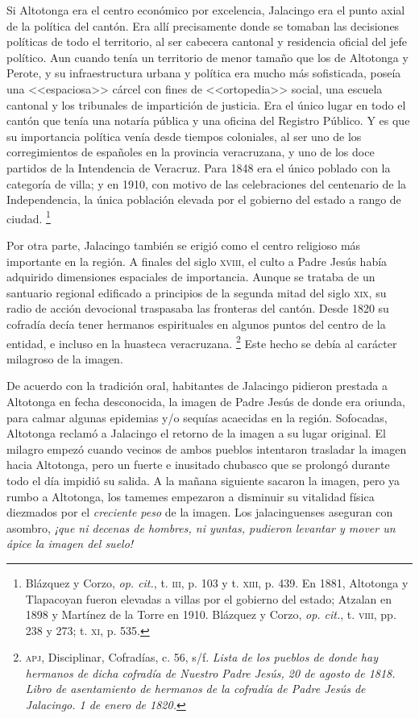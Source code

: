 \documentclass[14pt,twoside,final]{extbook} %
\let\oldfootnote\footnote
\renewcommand\footnote[1]{%
\oldfootnote{\hspace{1mm}#1}}
\begin{document}
Si Altotonga era el centro económico por excelencia, Jalacingo era el punto axial de la política del cantón. Era allí precisamente donde se tomaban las decisiones políticas de todo el territorio, al ser cabecera cantonal y residencia oficial del jefe político. Aun cuando tenía un territorio de menor tamaño que los de Altotonga y Perote, y su infraestructura urbana y política era mucho más sofisticada, poseía una <<espaciosa>> cárcel con fines de <<ortopedia>> social, una escuela cantonal y los tribunales de impartición de justicia. Era el único lugar en todo el cantón que tenía una notaría pública y una oficina del Registro Público. Y es que su importancia política venía desde tiempos coloniales, al ser uno de los corregimientos de españoles en la provincia veracruzana, y uno de los doce partidos de la Intendencia de Veracruz. Para 1848 era el único poblado con la categoría de villa; y en 1910, con motivo de las celebraciones del centenario de la Independencia, la única población elevada por el gobierno del estado a rango de ciudad.\footnote{Blázquez y Corzo, \emph{op. cit.}, t. \textsc{iii}, p. 103 y t. \textsc{xiii}, p. 439. En 1881, Altotonga y Tlapacoyan fueron elevadas a villas por el gobierno del estado; Atzalan en 1898 y Martínez de la Torre en 1910. Blázquez y Corzo, \emph{op. cit.}, t. \textsc{viii}, pp. 238 y 273; t. \textsc{xi}, p. 535.}

Por otra parte, Jalacingo también se erigió como el centro religioso más importante en la región. A finales del siglo \textsc{xviii}, el culto a Padre Jesús había adquirido dimensiones espaciales de importancia. Aunque se trataba de un santuario regional edificado a principios de la segunda mitad del siglo \textsc{xix}, su radio de acción devocional traspasaba las fronteras del cantón. Desde 1820 su cofradía decía tener hermanos espirituales en algunos puntos del centro de la entidad, e incluso en la huasteca veracruzana.\footnote{\textsc{apj}, Disciplinar, Cofradías, c. 56, s/f. \emph{Lista de los pueblos de donde hay hermanos de dicha cofradía de Nuestro Padre Jesús, 20 de agosto de 1818. Libro de asentamiento de hermanos de la cofradía de Padre Jesús de Jalacingo. 1 de enero de 1820.}} Este hecho se debía al carácter milagroso de la imagen.

De acuerdo con la tradición oral, habitantes de Jalacingo pidieron prestada a Altotonga en fecha desconocida, la imagen de Padre Jesús de donde era oriunda, para calmar algunas epidemias y/o sequías acaecidas en la región. Sofocadas, Altotonga reclamó a Jalacingo el retorno de la imagen a su lugar original. El milagro empezó cuando vecinos de ambos pueblos intentaron trasladar la imagen hacia Altotonga, pero un fuerte e inusitado chubasco que se prolongó durante todo el día impidió su salida. A la mañana siguiente sacaron la imagen, pero ya rumbo a Altotonga, los tamemes empezaron a disminuir su vitalidad física diezmados por el \emph{creciente peso} de la imagen. Los jalacinguenses aseguran con asombro, \emph{¡que ni decenas de hombres, ni yuntas, pudieron levantar y mover un ápice la imagen del suelo!}
\end{document}
